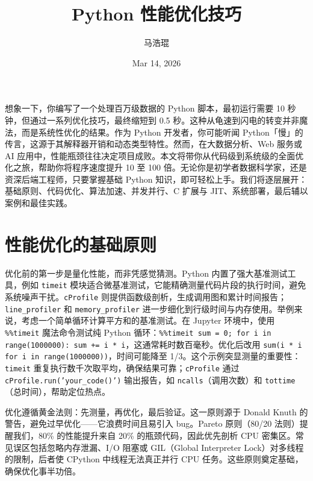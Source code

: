 \title{Python 性能优化技巧}
\author{马浩琨}
\date{Mar 14, 2026}
\maketitle
想象一下，你编写了一个处理百万级数据的 Python 脚本，最初运行需要 10 秒钟，但通过一系列优化技巧，最终缩短到 0.5 秒。这种从龟速到闪电的转变并非魔法，而是系统性优化的结果。作为 Python 开发者，你可能听闻 Python「慢」的传言，这源于其解释器开销和动态类型特性。然而，在大数据分析、Web 服务或 AI 应用中，性能瓶颈往往决定项目成败。本文将带你从代码级到系统级的全面优化之旅，帮助你将程序速度提升 10 至 100 倍。无论你是初学者数据科学家，还是资深后端工程师，只要掌握基础 Python 知识，即可轻松上手。我们将逐层展开：基础原则、代码优化、算法加速、并发并行、C 扩展与 JIT、系统部署，最后辅以案例和最佳实践。\par
\chapter{性能优化的基础原则}
优化前的第一步是量化性能，而非凭感觉猜测。Python 内置了强大基准测试工具，例如 \texttt{timeit} 模块适合微基准测试，它能精确测量代码片段的执行时间，避免系统噪声干扰。\texttt{cProfile} 则提供函数级剖析，生成调用图和累计时间报告；\texttt{line\_{}profiler} 和 \texttt{memory\_{}profiler} 进一步细化到行级时间与内存使用。举例来说，考虑一个简单循环计算平方和的基准测试。在 Jupyter 环境中，使用 \texttt{\%{}\%{}timeit} 魔法命令测试纯 Python 循环：\texttt{\%{}\%{}timeit sum = 0; for i in range(1000000): sum += i * i}，这通常耗时数百毫秒。优化后改用 \texttt{sum(i * i for i in range(1000000))}，时间可能降至 1/3。这个示例突显测量的重要性：\texttt{timeit} 重复执行数千次取平均，确保结果可靠；\texttt{cProfile} 通过 \texttt{cProfile.run('your\_{}code()')} 输出报告，如 \texttt{ncalls}（调用次数）和 \texttt{tottime}（总时间），帮助定位热点。\par
优化遵循黄金法则：先测量，再优化，最后验证。这一原则源于 Donald Knuth 的警告，避免过早优化——它浪费时间且易引入 bug。Pareto 原则（80/20 法则）提醒我们，80\%{} 的性能提升来自 20\%{} 的瓶颈代码，因此优先剖析 CPU 密集区。常见误区包括忽略内存泄漏、I/O 阻塞或 GIL（Global Interpreter Lock）对多线程的限制，后者使 CPython 中线程无法真正并行 CPU 任务。这些原则奠定基础，确保优化事半功倍。\par
